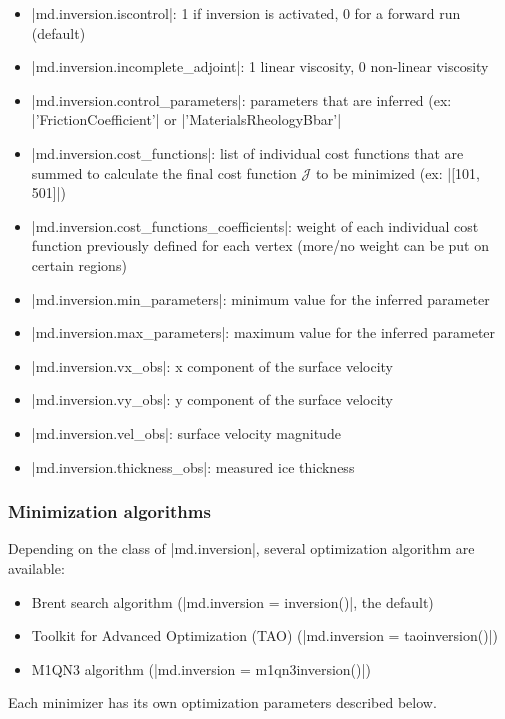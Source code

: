 \begin{itemize}
	\item \lstinlinebg|md.inversion.iscontrol|: 1 if inversion is activated, 0 for a forward run (default)
	\item \lstinlinebg|md.inversion.incomplete_adjoint|: 1 linear viscosity, 0 non-linear viscosity
	\item \lstinlinebg|md.inversion.control_parameters|: parameters that are inferred (ex: \lstinlinebg|{'FrictionCoefficient'}| or \lstinlinebg|{'MaterialsRheologyBbar'}|
	\item \lstinlinebg|md.inversion.cost_functions|: list of individual cost functions that are summed to calculate the final cost function $\mathcal J$ to be minimized (ex: \lstinlinebg|[101, 501]|)
	\item \lstinlinebg|md.inversion.cost_functions_coefficients|: weight of each individual cost function previously defined for each vertex (more/no weight can be put on certain regions)
	\item \lstinlinebg|md.inversion.min_parameters|: minimum value for the inferred parameter
	\item \lstinlinebg|md.inversion.max_parameters|: maximum value for the inferred parameter
	\item \lstinlinebg|md.inversion.vx_obs|: x component of the surface velocity
	\item \lstinlinebg|md.inversion.vy_obs|: y component of the surface velocity
	\item \lstinlinebg|md.inversion.vel_obs|: surface velocity magnitude
	\item \lstinlinebg|md.inversion.thickness_obs|: measured ice thickness
\end{itemize}

\subsubsection{Minimization algorithms}%
Depending on the class of \lstinlinebg|md.inversion|, several optimization algorithm are available:
\begin{itemize}
	\item Brent search algorithm (\lstinlinebg|md.inversion = inversion()|, the default)
	\item Toolkit for Advanced Optimization (TAO) (\lstinlinebg|md.inversion = taoinversion()|)
	\item M1QN3 algorithm (\lstinlinebg|md.inversion = m1qn3inversion()|)
\end{itemize}
Each minimizer has its own optimization parameters described below.

